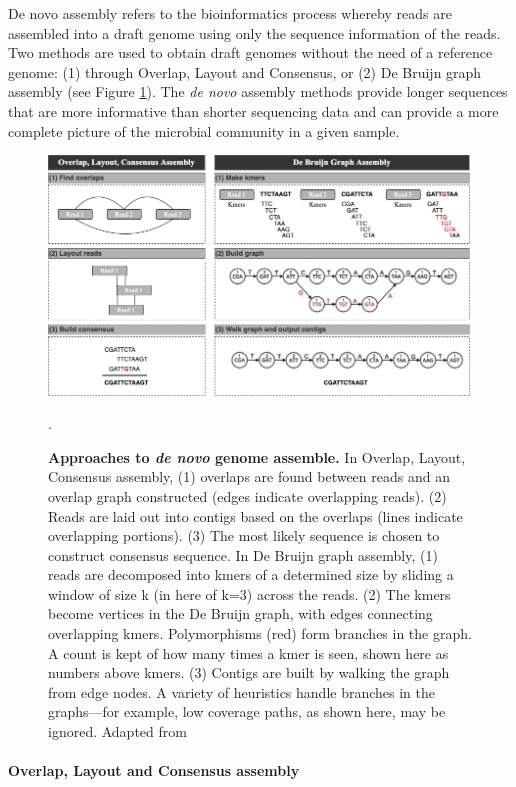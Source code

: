 De novo assembly refers to the bioinformatics process whereby reads are assembled into a draft genome using only the sequence information of the reads. Two methods are used to obtain draft genomes without the need of a reference genome: (1) through Overlap, Layout and Consensus, or (2) De Bruijn graph assembly (see Figure \ref{fig:figure8}). The \textit{de novo} assembly methods provide longer sequences that are more informative than shorter sequencing data and can provide a more complete picture of the microbial community in a given sample.

\begin{figure}[h!]
\centering
\includegraphics[width=\textwidth]{figures/introduction/Figure 8.png}
\caption{\textbf{Approaches to \textit{de novo} genome assemble.} In Overlap, Layout, Consensus assembly, (1) overlaps are found between reads and an overlap graph constructed (edges indicate overlapping reads). (2) Reads are laid out into contigs based on the overlaps (lines indicate overlapping portions). (3) The most likely sequence is chosen to construct consensus sequence. In De Bruijn graph assembly, (1) reads are decomposed into kmers of a determined size by sliding a window of size k (in here of k=3) across the reads. (2) The kmers become vertices in the De Bruijn graph, with edges connecting overlapping kmers. Polymorphisms (red) form branches in the graph. A count is kept of how many times a kmer is seen, shown here as numbers above kmers. (3) Contigs are built by walking the graph from edge nodes. A variety of heuristics handle branches in the graphs—for example, low coverage paths, as shown here, may be ignored. Adapted from \cite{ayling_new_2020}}.
\label{fig:figure8}
\end{figure}

\paragraph{Overlap, Layout and Consensus assembly} \label{sssec:_intro_OLC_assembly} \mbox\\

